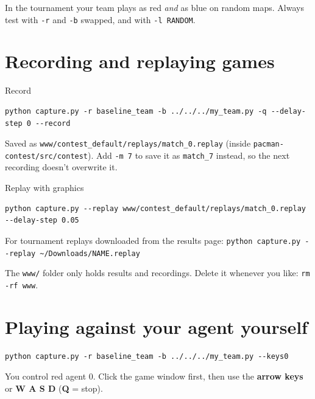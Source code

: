 \documentclass[11pt,a4paper]{article}
\newcommand{\p}[1]{\nolinkurl{#1}}  %
\begin{document}
\begin{careful}
In the tournament your team plays as red \emph{and} as blue on random maps. Always test with \texttt{-r} and \texttt{-b} swapped, and with \texttt{-l RANDOM}.
\end{careful}

\section{Recording and replaying games}

\begin{step}{Record}
\begin{lstlisting}
python capture.py -r baseline_team -b ../../../my_team.py -q --delay-step 0 --record
\end{lstlisting}
Saved as \p{www/contest_default/replays/match_0.replay} (inside \p{pacman-contest/src/contest}).
Add \texttt{-m 7} to save it as \texttt{match\_7} instead, so the next recording doesn't overwrite it.
\end{step}

\begin{step}{Replay with graphics}
\begin{lstlisting}
python capture.py --replay www/contest_default/replays/match_0.replay --delay-step 0.05
\end{lstlisting}
For tournament replays downloaded from the results page:
\p{python capture.py --replay ~/Downloads/NAME.replay}
\end{step}

The \texttt{www/} folder only holds results and recordings. Delete it whenever you like: \texttt{rm -rf www}.

\section{Playing against your agent yourself}
\begin{lstlisting}
python capture.py -r baseline_team -b ../../../my_team.py --keys0
\end{lstlisting}
You control red agent 0. Click the game window first, then use the \textbf{arrow keys} or \textbf{W A S D} (\textbf{Q} = stop).

\end{document}
